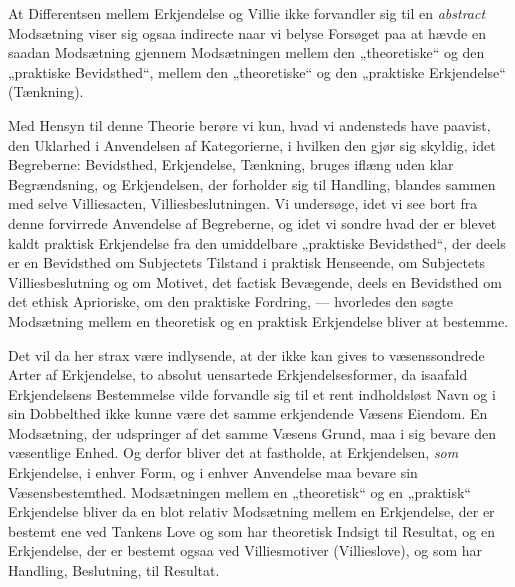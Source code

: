 At Differentsen mellem Erkjendelse og Villie ikke forvandler sig til en
\emph{abstract} Modsætning viser sig ogsaa indirecte naar vi belyse Forsøget
paa at hævde en saadan Modsætning gjennem Modsætningen mellem den
„theoretiske“ og den „praktiske Bevidsthed“, mellem den „theoretiske“ og den
„praktiske Erkjendelse“ (Tænkning).

Med Hensyn til denne Theorie berøre vi kun, hvad vi andensteds have paavist,
den Uklarhed i Anvendelsen af Kategorierne, i hvilken den gjør sig skyldig,
idet Begreberne: Bevidsthed, Erkjendelse, Tænkning, bruges iflæng uden klar
Begrændsning, og Erkjendelsen, der forholder sig til Handling, blandes sammen
med selve Villiesacten, Villiesbeslutningen. Vi undersøge, idet vi see bort
fra denne forvirrede Anvendelse af Begreberne, og idet vi sondre hvad der er
blevet kaldt praktisk Erkjendelse fra den umiddelbare „praktiske Bevidsthed“,
der deels er en Bevidsthed om Subjectets Tilstand i praktisk Henseende, om
Subjectets Villiesbeslutning og om Motivet, det factisk Bevægende, deels en
Bevidsthed om det ethisk Aprioriske, om den praktiske Fordring, --- hvorledes
den søgte Modsætning mellem en theoretisk og en praktisk Erkjendelse bliver at
bestemme.

Det vil da her strax være indlysende, at der ikke kan gives to væsenssondrede
Arter af Erkjendelse, to absolut uensartede Erkjendelsesformer, da isaafald
Erkjendelsens Bestemmelse vilde forvandle sig til et rent indholdsløst Navn og
i sin Dobbelthed ikke kunne være det samme erkjendende Væsens Eiendom. En
Modsætning, der udspringer af det samme Væsens Grund, maa i sig bevare den
væsentlige Enhed. Og derfor bliver det at fastholde, at Erkjendelsen,
\emph{som} Erkjendelse, i enhver Form, og i enhver Anvendelse maa bevare sin
Væsensbestemthed.
 Modsætningen mellem en „theoretisk“ og en „praktisk“ Erkjendelse bliver da en
blot relativ Modsætning mellem en Erkjendelse, der er bestemt ene ved Tankens
Love og som har theoretisk Indsigt til Resultat, og en Erkjendelse, der er
bestemt ogsaa ved Villiesmotiver (Villieslove), og som har Handling,
Beslutning, til Resultat.

